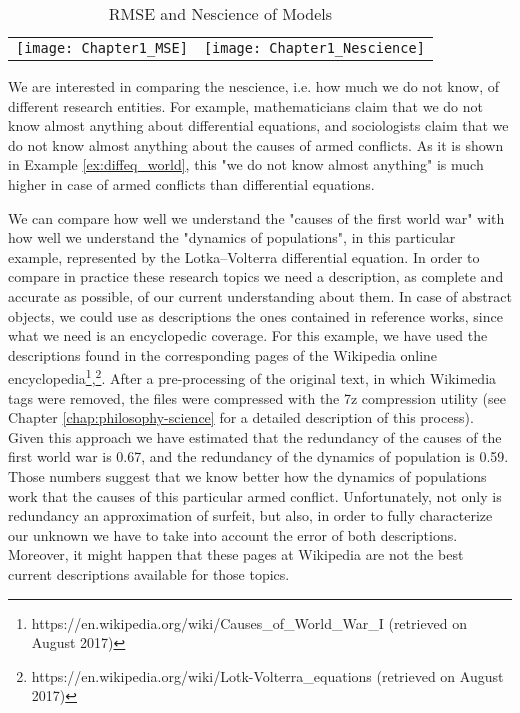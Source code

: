 \begin{table*}
\begin{centering}
\begin{tabular}{c c}
\centering\texttt{[image: Chapter1\_MSE]}
&
\centering\texttt{[image: Chapter1\_Nescience]}
\end{tabular}
\par\end{centering}
\caption{\label{tab:Nescience_Models}RMSE and Nescience of Models}
\end{table*}

We are interested in comparing the nescience, i.e. how much we do not know, of different research entities. For example, mathematicians claim that we do not know almost anything about differential equations, and sociologists claim that we do not know almost anything about the causes of armed conflicts. As it is shown in Example \ref{ex:diffeq_world}, this "we do not know almost anything" is much higher in case of armed conflicts than differential equations.

\begin{example}
\label{ex:diffeq_world}
We can compare how well we understand the "causes of the first world war" with how well we understand the "dynamics of populations", in this particular example, represented by the Lotka–Volterra differential equation. In order to compare in practice these research topics we need a description, as complete and accurate as possible, of our current understanding about them. In case of abstract objects, we could use as descriptions the ones contained in reference works, since what we need is an encyclopedic coverage. For this example, we have used the descriptions found in the corresponding pages of the Wikipedia online encyclopedia\footnote{https://en.wikipedia.org/wiki/Causes\_of\_World\_War\_I (retrieved on August 2017)},\footnote{https://en.wikipedia.org/wiki/Lotk-Volterra\_equations (retrieved on August 2017)}. After a pre-processing of the original text, in which Wikimedia tags were removed, the files were compressed with the 7z compression utility (see Chapter \ref{chap:philosophy-science} for a detailed description of this process). Given this approach we have estimated that the redundancy of the causes of the first world war is 0.67, and the redundancy of the dynamics of population is 0.59. Those numbers suggest that we know better how the dynamics of populations work that the causes of this particular armed conflict. Unfortunately, not only is redundancy an approximation of surfeit, but also, in order to fully characterize our unknown we have to take into account the error of both descriptions. Moreover, it might happen that these pages at Wikipedia are not the best current descriptions available for those topics.
\end{example}

